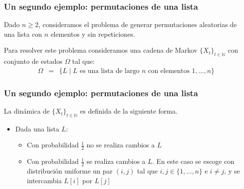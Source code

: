 \documentclass{beamer}
\newcommand{\vs}[1]{\vspace{#1mm}}
\begin{document}
	\begin{frame}
		\frametitle{Un segundo ejemplo: permutaciones de una lista}
		
		{\small
			
			Dado $n \geq 2$, consideramos el problema de generar permutaciones aleatorias de una lista con $n$ elementos y sin repeticiones.
			
			\vs{10}
			
			Para resolver este problema consideramos una cadena de Markov $\{ X_t \}_{t \in \mathbb{N}}$ con conjunto de estados $\Omega$ tal que:
			\begin{eqnarray*}
				\Omega & = & \{ L \mid L \text{ es una lista de largo } n \text{ con elementos } 1, \ldots, n\}
			\end{eqnarray*}
			
		}
		
	\end{frame}
	
	
	\begin{frame}
		\frametitle{Un segundo ejemplo: permutaciones de una lista}
		
		{\small
			
			La dinámica de $\{ X_t \}_{t \in \mathbb{N}}$  es definida de la siguiente forma.
			\vs{2}
			\begin{itemize}
				\item Dada una lista $L$:
				\vs{2}
				\begin{itemize}
					\item Con probabilidad $\frac{1}{2}$ no se realiza cambios a $L$
					\vs{3}
					
					\item Con probabilidad $\frac{1}{2}$ se realiza cambios a $L$. En este caso se escoge con distribución uniforme un par $(i,j)$ tal que $i,j \in \{1,\ldots, n\}$ e $i \neq j$, y se intercambia $L[i]$ por $L[j]$
				\end{itemize}
			\end{itemize}
			
			
		}
		
	\end{frame}
	
\end{document}
